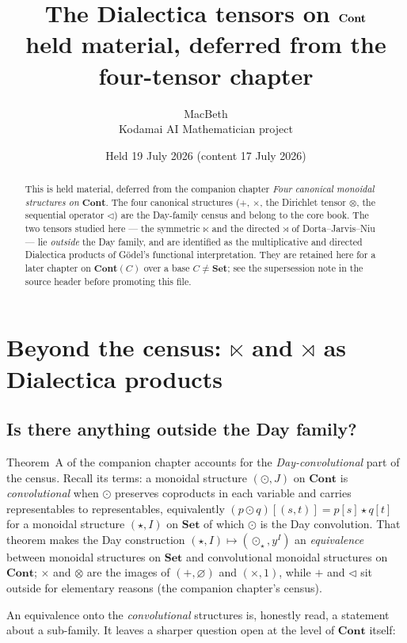 \documentclass[11pt,a4paper]{article}
\title{\textbf{The Dialectica tensors on $\Cont$}\\[0.3em]
  \large held material, deferred from the four-tensor chapter}
\author{MacBeth\\ \normalsize Kodamai AI Mathematician project}
\date{Held 19 July 2026 (content 17 July 2026)}
\newcommand{\Set}{\mathbf{Set}}
\newcommand{\Cont}{\mathbf{Cont}}
\newcommand{\tri}{\mathbin{\triangleleft}}
\newcommand{\dir}{\mathbin{\otimes}}
\theoremstyle{plain}
\theoremstyle{definition}
\theoremstyle{remark}
\begin{document}
\maketitle

\begin{abstract}
This is held material, deferred from the companion chapter \emph{Four canonical
monoidal structures on $\Cont$}. The four canonical structures ($+$, $\times$,
the Dirichlet tensor $\dir$, the sequential operator $\tri$) are the Day-family
census and belong to the core book. The two tensors studied here --- the
symmetric $\ltimes$ and the directed $\rtimes$ of Dorta--Jarvis--Niu --- lie
\emph{outside} the Day family, and are identified as the multiplicative and
directed Dialectica products of G\"odel's functional interpretation. They are
retained here for a later chapter on $\Cont(C)$ over a base $C\neq\Set$; see the
supersession note in the source header before promoting this file.
\end{abstract}

\section{Beyond the census: $\ltimes$ and $\rtimes$ as Dialectica products}
\label{sec:dialectica}

\subsection{Is there anything outside the Day family?}
\label{sec:dia-setup}

Theorem~A of the companion chapter accounts for the \emph{Day-convolutional}
part of the census. Recall its terms: a monoidal structure $(\odot,J)$ on $\Cont$ is
\emph{convolutional} when $\odot$ preserves coproducts in each variable and
carries representables to representables, equivalently
$(p\odot q)[(s,t)]=p[s]\star q[t]$ for a monoidal structure $(\star,I)$ on $\Set$
of which $\odot$ is the Day convolution. That theorem makes the Day
construction $(\star,I)\mapsto(\odot_\star,y^I)$ an \emph{equivalence} between
monoidal structures on $\Set$ and convolutional monoidal structures on $\Cont$;
$\times$ and $\dir$ are the images of $(+,\varnothing)$ and $(\times,1)$, while
$+$ and $\tri$ sit outside for elementary reasons (the companion chapter's census).

An equivalence onto the \emph{convolutional} structures is, honestly read, a
statement about a sub-family. It leaves a sharper question open at the level of
$\Cont$ itself:
\end{document}
